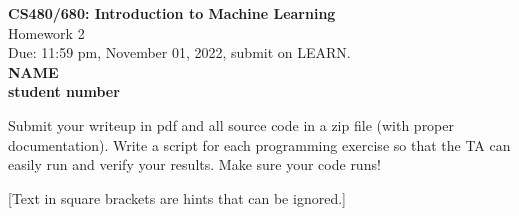 \documentclass[10pt,letter,notitlepage]{article}
\newcommand{\red}[1]{{\color{red}#1}}
\newcommand{\green}[1]{{\color{green}#1}}
\begin{document}
	
	\begin{center}
		\large{\textbf{CS480/680: Introduction to Machine Learning} \\ Homework 2\\ \red{Due: 11:59 pm, November 01, 2022}, \red{submit on LEARN}.} \\
		
		{\bf \green{NAME}} \\
		{\bf \green{student number}}
		
	\end{center}
	
	\begin{center}
		Submit your writeup in pdf and all source code in a zip file (with proper documentation). Write a script for each programming exercise so that the TA can easily run and verify your results. Make sure your code runs!
		
		[Text in square brackets are hints that can be ignored.]
	\end{center}
\end{document}
